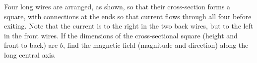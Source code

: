         Four long wires are arranged, as shown, so that their
        cross-section forms a square, with connections at the ends
        so that current flows through all four before exiting.
        Note that the current is to the right in the two back wires,
        but to the left in the front wires. If the dimensions of the
        cross-sectional square (height and front-to-back) are $b$,
        find the magnetic field (magnitude and direction) along
        the long central axis.\answercheck
